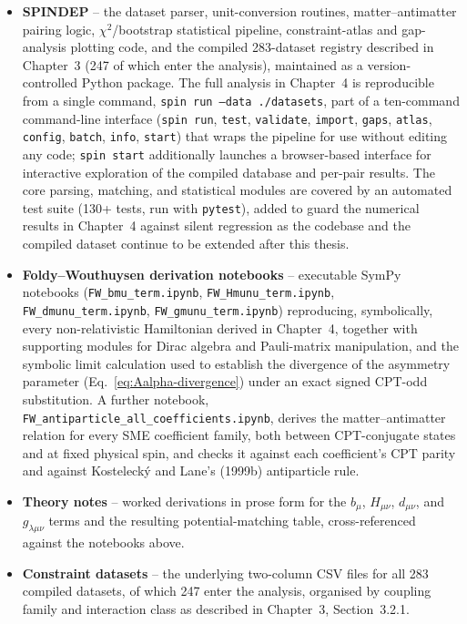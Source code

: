\begin{itemize}
  \item \textbf{SPINDEP} -- the dataset parser, unit-conversion routines,
    matter--antimatter pairing logic, $\chi^2$/bootstrap statistical
    pipeline, constraint-atlas and gap-analysis plotting code, and the
    compiled 283-dataset registry described in Chapter~3 (247 of which enter
    the analysis), maintained as a
    version-controlled Python package. The full analysis in Chapter~4 is
    reproducible from a single command, \texttt{spin run --data
    ./datasets}, part of a ten-command command-line interface
    (\texttt{spin run}, \texttt{test}, \texttt{validate}, \texttt{import},
    \texttt{gaps}, \texttt{atlas}, \texttt{config}, \texttt{batch},
    \texttt{info}, \texttt{start}) that wraps the pipeline for use without
    editing any code; \texttt{spin start} additionally launches a
    browser-based interface for interactive exploration of the compiled
    database and per-pair results. The core parsing, matching, and
    statistical modules are covered by an automated test suite (130+
    tests, run with \texttt{pytest}), added to guard the numerical results
    in Chapter~4 against silent regression as the codebase and the
    compiled dataset continue to be extended after this thesis.
  \item \textbf{Foldy--Wouthuysen derivation notebooks} -- executable
    SymPy notebooks (\texttt{FW\_bmu}\allowbreak\texttt{\_term.ipynb},
    \texttt{FW\_Hmunu}\allowbreak\texttt{\_term.ipynb},
    \texttt{FW\_dmunu}\allowbreak\texttt{\_term.ipynb},
    \texttt{FW\_gmunu}\allowbreak\texttt{\_term.ipynb})
    reproducing, symbolically, every non-relativistic Hamiltonian derived
    in Chapter~4, together with supporting modules for Dirac algebra and
    Pauli-matrix manipulation, and the symbolic limit calculation used to
    establish the divergence of the asymmetry parameter
    (Eq.~\eqref{eq:Aalpha-divergence}) under an exact signed CPT-odd
    substitution. A further notebook,
    \texttt{FW\_antiparticle}\allowbreak\texttt{\_all}\allowbreak\texttt{\_coefficients.ipynb},
    derives the matter--antimatter relation for every SME coefficient
    family, both between CPT-conjugate states and at fixed physical spin,
    and checks it against each coefficient's CPT parity and against
    Kostelecký and Lane's (1999b) antiparticle rule.
  \item \textbf{Theory notes} -- worked derivations in prose form for the
    $b_\mu$, $H_{\mu\nu}$, $d_{\mu\nu}$, and $g_{\lambda\mu\nu}$ terms and the resulting
    potential-matching table, cross-referenced against the notebooks above.
  \item \textbf{Constraint datasets} -- the underlying two-column CSV files
    for all 283 compiled datasets, of which 247 enter the analysis, organised by coupling family and
    interaction class as described in Chapter~3, Section~3.2.1.
\end{itemize}


